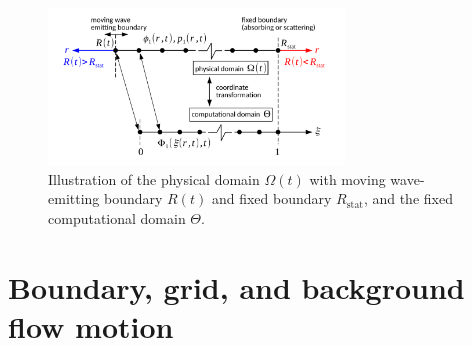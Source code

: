 \begin{figure}
\centering
\includegraphics[width=0.7\textwidth]{figures/domain3.pdf}
\caption{Illustration of the physical domain $\Omega\left(t\right)$ with moving wave-emitting boundary $R\left(t\right)$ and fixed boundary $R_{\mathrm{stat}}$, and the fixed computational domain $\Theta$.}
\label{fig:domain3}
\end{figure}




\section{Boundary, grid, and background flow motion}
\label{sec:Boundary, grid, and background flow motion}

